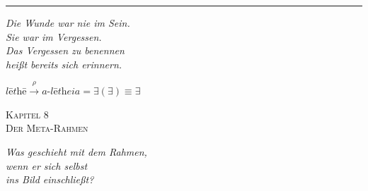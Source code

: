 \documentclass[10pt, openany, oneside]{book}
\renewcommand{\large}{\fontsize{11.5}{14}\selectfont}
\renewcommand{\huge}{\fontsize{17}{21}\selectfont}
\begin{document}
\begin{center}
    \rule{0.15\textwidth}{0.3pt}
\end{center}

\vspace{0.5em}

\begin{center}
    \itshape
    Die Wunde war nie im Sein.\\
    Sie war im Vergessen.\\[0.8em]
    Das Vergessen zu benennen\\
    heißt bereits sich erinnern.
\end{center}

\vspace{0.5em}

\begin{center}
    $\textit{l\={e}th\={e}} \xrightarrow{\rho} \textit{a-l\={e}theia} = \exists(\exists) \equiv \exists$
\end{center}

%
%
%
%

\newpage

\begin{center}
    {\huge\scshape Kapitel 8}\\[0.3em]
    {\large\scshape Der Meta-Rahmen}
\end{center}

\vspace{1.5em}

\begin{center}
    \itshape
    Was geschieht mit dem Rahmen,\\
    wenn er sich selbst\\
    ins Bild einschließt?
\end{center}

\vspace{2em}

\end{document}
